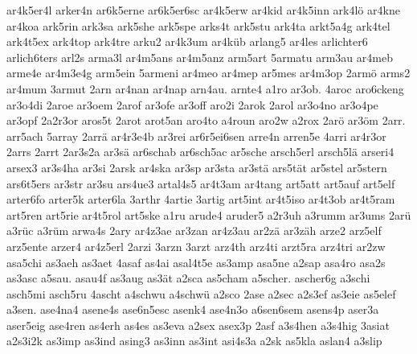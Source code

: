 {    ar4k5er4l
    arker4n
    ar6k5erne
    ar6k5er6sc
    ar4k5erw
    ar4kid
    ar4k5inn
    ark4lö
    ar4kne
    ar4koa
    ark5rin
    ark3sa
    ark5she
    ark5spe
    arks4t
    ark5stu
    ark4ta
    arkt5a4g
    ark4tel
    ark4t5ex
    ark4top
    ark4tre
    arku2
    ar4k3um
    ar4küb
    arlang5
    ar4les
    arlichter6
    arlich6ters
    arl2s
    arma3l
    ar4m5ans
    ar4m5anz
    arm5art
    5armatu
    arm3au
    ar4meb
    arme4e
    ar4m3e4g
    arm5ein
    5armeni
    ar4meo
    ar4mep
    ar5mes
    ar4m3op
    2armö
    arms2
    ar4mum
    3armut
    2arn
    ar4nan
    ar4nap
    arn4au.
    arnte4
    a1ro
    ar3ob.
    4aroc
    aro6ckeng
    ar3o4di
    2aroe
    ar3oem
    2arof
    ar3ofe
    ar3off
    aro2i
    2arok
    2arol
    ar3o4no
    ar3o4pe
    ar3opf
    2a2r3or
    aros5t
    2arot
    arot5an
    aro4to
    a4roun
    aro2w
    a2rox
    2arö
    ar3öm
    2arr.
    arr5ach
    5array
    2arrä
    ar4r3e4b
    ar3rei
    ar6r5ei6sen
    arre4n
    arren5e
    4arri
    ar4r3or
    2arrs
    2arrt
    2ar3s2a
    ar3sä
    ar6schab
    ar6sch5ac
    ar5sche
    arsch5erl
    arsch5lä
    arseri4
    arsex3
    ar3s4ha
    ar3si
    2arsk
    ar4ska
    ar3sp
    ar3sta
    ar3stä
    ars5tät
    ar5stel
    ar5stern
    ars6t5ers
    ar3str
    ar3su
    ars4ue3
    artal4s5
    ar4t3am
    ar4tang
    art5att
    art5auf
    art5elf
    arter6fo
    arter5k
    arter6la
    3arthr
    4artie
    3artig
    art5int
    ar4t5iso
    ar4t3ob
    ar4t5ram
    art5ren
    art5rie
    ar4t5rol
    art5ske
    a1ru
    arude4
    aruder5
    a2r3uh
    a3rumm
    ar3ums
    2arü
    a3rüc
    a3rüm
    arwa4s
    2ary
    ar4z3ae
    ar3zan
    ar4z3au
    ar2zä
    ar3zäh
    arze2
    arz5elf
    arz5ente
    arzer4
    ar4z5erl
    2arzi
    3arzn
    3arzt
    arz4th
    arz4ti
    arzt5ra
    arz4tri
    ar2zw
    asa5chi
    as3aeh
    as3aet
    4asaf
    as4ai
    asal4t5e
    as3amp
    asa5ne
    a2sap
    asa4ro
    asa2s
    as3asc
    a5sau.
    asau4f
    as3aug
    as3ät
    a2sca
    as5cham
    a5scher.
    ascher6g
    a3schi
    asch5mi
    asch5ru
    4ascht
    a4schwu
    a4schwü
    a2sco
    2ase
    a2sec
    a2s3ef
    as3eie
    as5elef
    a3sen.
    ase4na4
    asene4s
    ase6n5esc
    asenk4
    ase4n3o
    a6sen6sem
    asens4p
    aser3a
    aser5eig
    ase4ren
    as4erh
    as4es
    as3eva
    a2sex
    asex3p
    2asf
    a3s4hen
    a3s4hig
    3asiat
    a2s3i2k
    as3imp
    as3ind
    asing3
    as3inn
    as3int
    asi4s3a
    a2sk
    as5kla
    aslan4
    a3slip
}

